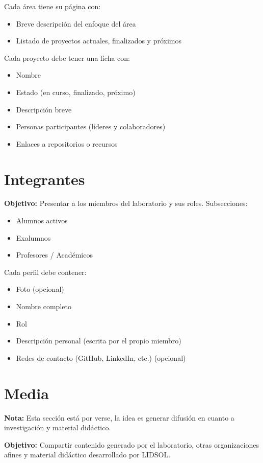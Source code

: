 \documentclass[12pt]{article}
\begin{document}
Cada área tiene su página con:
\begin{itemize}[label=--]
    \item Breve descripción del enfoque del área
    \item Listado de proyectos actuales, finalizados y próximos
\end{itemize}

Cada proyecto debe tener una ficha con:
\begin{itemize}[label=--]
    \item Nombre
    \item Estado (en curso, finalizado, próximo)
    \item Descripción breve
    \item Personas participantes (líderes y colaboradores)
    \item Enlaces a repositorios o recursos
\end{itemize}

\section{Integrantes}
\textbf{Objetivo:} Presentar a los miembros del laboratorio y sus roles.  
Subsecciones:
\begin{itemize}
    \item Alumnos activos
    \item Exalumnos
    \item Profesores / Académicos
\end{itemize}

Cada perfil debe contener:
\begin{itemize}[label=--]
    \item Foto (opcional)
    \item Nombre completo
    \item Rol
    \item Descripción personal (escrita por el propio miembro)
    \item Redes de contacto (GitHub, LinkedIn, etc.) (opcional)
\end{itemize}

\section{Media}
\textbf{Nota:} Esta sección está por verse, la idea es generar difusión en cuanto a investigación y material didáctico.

\textbf{Objetivo:} Compartir contenido generado por el laboratorio, otras organizaciones afines y material didáctico desarrollado por LIDSOL.
\end{document}
